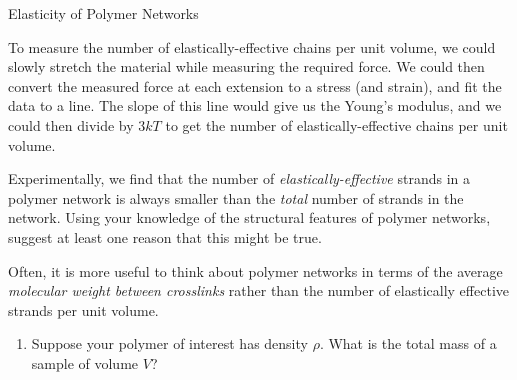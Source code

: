 \begin{activity}{Elasticity of Polymer Networks}
\begin{ctqs}
		\begin{solution}[1.75in]
		
			To measure the number of elastically-effective chains per unit volume, we could slowly stretch the material while measuring the required force.  We could then convert the measured force at each extension to a stress (and strain), and fit the data to a line.  The slope of this line would give us the Young's modulus, and we could then divide by $3kT$ to get the number of elastically-effective chains per unit volume.
		
		\end{solution}
\end{ctqs}


\begin{exercises}

	\exercise Experimentally, we find that the number of \emph{elastically-effective} strands in a polymer network is always smaller than the \emph{total} number of strands in the network.  Using your knowledge of the structural features of polymer networks, suggest at least one reason that this might be true.
	
		\begin{solution}
		\end{solution}
	
	
	
	
	\exercise Often, it is more useful to think about polymer networks in terms of the average \emph{molecular weight between crosslinks} rather than the number of elastically effective strands per unit volume.
	
		\begin{enumerate}
			\item Suppose your polymer of interest has density $\rho$.  What is the total mass of a sample of volume $V$?
			

\end{enumerate}
\end{exercises}
\end{activity}
